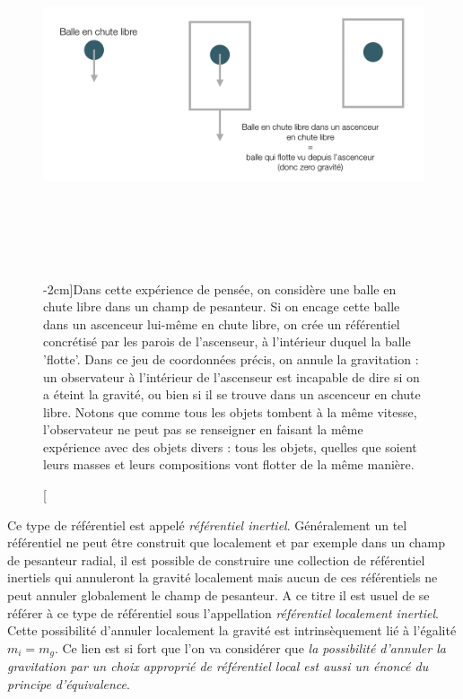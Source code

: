 \begin{figure}[htbp]
	\centering
		\includegraphics[height=10cm]{figs/ascenceur.png}
	\caption[Annulation du champ de pesanteur][-2cm]{Dans cette expérience de pensée, on considère une balle en chute libre dans un champ de pesanteur. Si on encage cette balle dans un ascenceur lui-même en chute libre, on crée un référentiel concrétisé par les parois de l'ascenseur, à l'intérieur duquel la balle 'flotte'. Dans ce jeu de coordonnées précis, on annule la gravitation : un observateur à l'intérieur de l'ascenseur est incapable de dire si on a éteint la gravité, ou bien si il se trouve dans un ascenceur en chute libre. Notons que comme tous les objets tombent à la même vitesse, l'observateur ne peut pas se renseigner en faisant la même expérience avec des objets divers : tous les objets, quelles que soient leurs masses et leurs compositions vont flotter de la même manière. }
	\label{f:ascenceur}
\end{figure}


Ce type de référentiel est appelé \textit{référentiel inertiel}. Généralement un tel référentiel ne peut être construit que localement et par exemple dans un champ de pesanteur radial, il est possible de construire une collection de référentiel inertiels qui annuleront la gravité localement mais aucun de ces référentiels ne peut annuler globalement le champ de pesanteur. A ce titre il est usuel de se référer à ce type de référentiel sous l'appellation \textit{référentiel localement inertiel}. Cette possibilité d'annuler localement la gravité est intrinsèquement lié à l'égalité $m_i=m_g$. Ce lien est si fort que l'on va considérer que \textit{la possibilité d'annuler la gravitation par un choix approprié de référentiel local est aussi un énoncé du principe d'équivalence}. 

